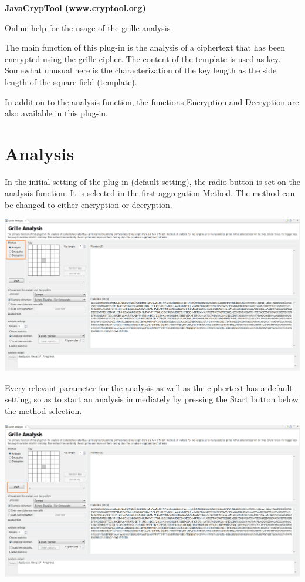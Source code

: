 \documentclass[fontsize=12pt, DIV=15, parskip=half-]{scrartcl}
\theoremstyle{break}
\begin{document}
\begin{center}
\Large\bfseries\sffamily JavaCrypTool (\url{www.cryptool.org})

Online help for the usage of the grille analysis  \\[0.1\baselineskip]
\normalsize\normalfont 
\end{center}
\vspace*{0.5\baselineskip}

\tableofcontents
\newpage

The main function of this plug-in is the analysis of a ciphertext that has been encrypted using the grille cipher. The content of the template is used as key. Somewhat unusual here is the characterization of the key length as the side length of the square field (template).

In addition to the analysis function, the functions \hyperlink{verschl} {Encryption} and \hyperlink{entschl}{Decryption} are also available in this plug-in.


\section{Analysis}
In the initial setting of the plug-in (default setting), the radio button is set on the analysis function. It is selected in the first aggregation \glqq Method\grqq. The method can be changed to either encryption or decryption.

\includegraphics[scale=0.45]{enFleissnerMethods.png}

Every relevant parameter for the analysis as well as the ciphertext has a default setting, so as to start an analysis immediately by pressing the \glqq Start\grqq{} button below the method selection.

\includegraphics[scale=0.45]{enFleissnerStart.png}
\end{document}
